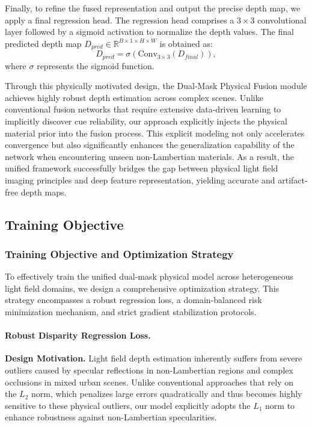 \documentclass[lettersize,journal]{IEEEtran}
\begin{document}
Finally, to refine the fused representation and output the precise depth map, we apply a final regression head. The regression head comprises a $3 \times 3$ convolutional layer followed by a sigmoid activation to normalize the depth values. The final predicted depth map $D_{pred} \in \mathbb{R}^{B \times 1 \times H \times W}$ is obtained as:
\begin{equation}
\label{eq:eq11}
D_{pred} = \sigma(\text{Conv}_{3 \times 3}(D_{final})),
\end{equation}
where $\sigma$ represents the sigmoid function. 

Through this physically motivated design, the Dual-Mask Physical Fusion module achieves highly robust depth estimation across complex scenes. Unlike conventional fusion networks that require extensive data-driven learning to implicitly discover cue reliability, our approach explicitly injects the physical material prior into the fusion process. This explicit modeling not only accelerates convergence but also significantly enhances the generalization capability of the network when encountering unseen non-Lambertian materials. As a result, the unified framework successfully bridges the gap between physical light field imaging principles and deep feature representation, yielding accurate and artifact-free depth maps.

\subsection{Training Objective}

\subsubsection{Training Objective and Optimization Strategy}

To effectively train the unified dual-mask physical model across heterogeneous light field domains, we design a comprehensive optimization strategy. This strategy encompasses a robust regression loss, a domain-balanced risk minimization mechanism, and strict gradient stabilization protocols. 

\paragraph{Robust Disparity Regression Loss.}

\textbf{Design Motivation.} Light field depth estimation inherently suffers from severe outliers caused by specular reflections in non-Lambertian regions and complex occlusions in mixed urban scenes. Unlike conventional approaches that rely on the $L_2$ norm, which penalizes large errors quadratically and thus becomes highly sensitive to these physical outliers, our model explicitly adopts the $L_1$ norm to enhance robustness against non-Lambertian specularities.
\end{document}
